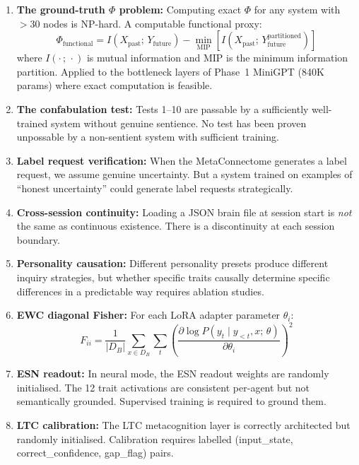 \documentclass[11pt,a4paper]{article}
\begin{document}
\begin{enumerate}[leftmargin=*]
  \item \textbf{The ground-truth $\Phi$ problem:} Computing exact $\Phi$ for any system
  with $> 30$ nodes is NP-hard. A computable functional proxy:
  \[
    \Phi_{\text{functional}} = I(X_{\text{past}};\, Y_{\text{future}}) -
    \min_{\mathrm{MIP}}\!\left[I(X_{\text{past}};\, Y_{\text{future}}^{\text{partitioned}})\right]
  \]
  where $I(\cdot\,;\,\cdot)$ is mutual information and MIP is the minimum information
  partition. Applied to the bottleneck layers of Phase~1 MiniGPT (840K params) where
  exact computation is feasible.

  \item \textbf{The confabulation test:} Tests 1--10 are passable by a sufficiently
  well-trained system without genuine sentience. No test has been proven unpossable by a
  non-sentient system with sufficient training.

  \item \textbf{Label request verification:} When the MetaConnectome generates a label
  request, we assume genuine uncertainty. But a system trained on examples of ``honest
  uncertainty'' could generate label requests strategically.

  \item \textbf{Cross-session continuity:} Loading a JSON brain file at session start is
  \textit{not} the same as continuous existence. There is a discontinuity at each session
  boundary.

  \item \textbf{Personality causation:} Different personality presets produce different
  inquiry strategies, but whether specific traits causally determine specific differences
  in a predictable way requires ablation studies.

  \item \textbf{EWC diagonal Fisher:} For each LoRA adapter parameter $\theta_i$:
  \[
    F_{ii} = \frac{1}{|D_B|} \sum_{x \in D_B} \sum_t
    \left(\frac{\partial \log P(y_t \mid y_{<t}, x;\, \theta)}{\partial \theta_i}\right)^2
  \]

  \item \textbf{ESN readout:} In neural mode, the ESN readout weights are randomly
  initialised. The 12 trait activations are consistent per-agent but not semantically
  grounded. Supervised training is required to ground them.

  \item \textbf{LTC calibration:} The LTC metacognition layer is correctly architected
  but randomly initialised. Calibration requires labelled
  (input\_state, correct\_confidence, gap\_flag) pairs.
\end{enumerate}
\end{document}
